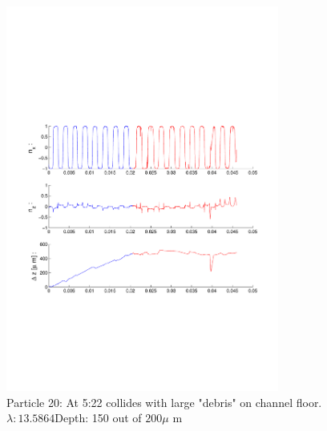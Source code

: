 \begin{figure}[ H]

\caption{Particle 20: At 5:22 collides with large "debris" on channel floor. $ \lambda: 13.5864$Depth: 150 out of $200 \mu $ m}

\centering

\includegraphics[width=0.8\textwidth]{Images/Particle 20/Particle20.pdf}

\end{figure}

